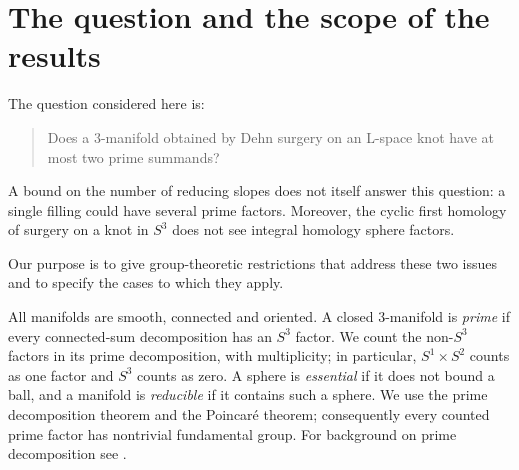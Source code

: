 \documentclass[11pt]{article}
\theoremstyle{remark}
\begin{document}
\begin{abstract}
We study the question whether surgery on an L-space knot has at most two prime summands. For a fibered knot of genus $g\geq1$ in $S^3$, we prove that a nonzero rational surgery whose numerator has absolute value $2g-1$ has at most two nontrivial prime summands. The proof uses the free commutator subgroup of the knot group and explicit covers of free products; it retains integral homology sphere factors that first homology alone cannot detect. A related argument shows that a nonzero integer surgery with at least three summands on a fibered hyperbolic knot must satisfy $|p|\leq2g-1$. Together with the reducing-slope theorem of Hom--Lidman--Zufelt, the first result gives the two-summand bound for hyperbolic knots in $S^3$ admitting a mod-two L-space surgery. We also give a formal obstruction to a difference-only argument and explain the role of the ambient manifold through a Seifert-fibered example. These are partial results on the original question, not an all-knot, all-coefficient conclusion.
\end{abstract}


\section{The question and the scope of the results}

The question considered here is:
\begin{quote}
Does a $3$-manifold obtained by Dehn surgery on an L-space knot have at most two prime summands?
\end{quote}
A bound on the number of reducing slopes does not itself answer this question: a single filling could have several prime factors. Moreover, the cyclic first homology of surgery on a knot in $S^3$ does not see integral homology sphere factors.


Our purpose is to give group-theoretic restrictions that address these two issues and to specify the cases to which they apply.

All manifolds are smooth, connected and oriented. A closed $3$-manifold is \emph{prime} if every connected-sum decomposition has an $S^3$ factor. We count the non-$S^3$ factors in its prime decomposition, with multiplicity; in particular, $S^1\times S^2$ counts as one factor and $S^3$ counts as zero. A sphere is \emph{essential} if it does not bound a ball, and a manifold is \emph{reducible} if it contains such a sphere. We use the prime decomposition theorem and the Poincar\'e theorem; consequently every counted prime factor has nontrivial fundamental group. For background on prime decomposition see \cite[Section~1.1]{Hatcher}.
\end{document}
